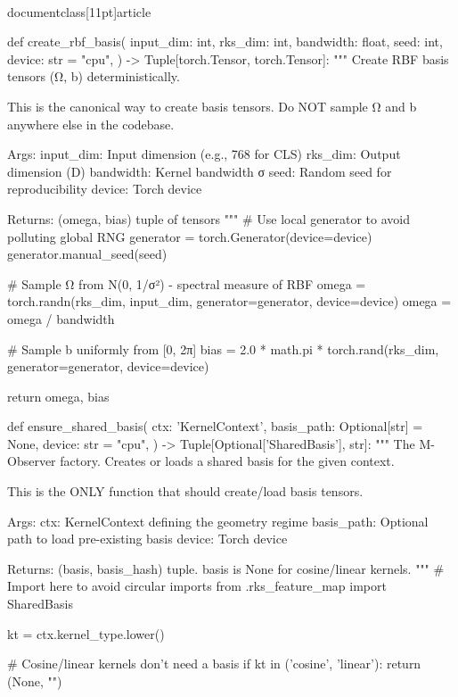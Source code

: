 \\documentclass[11pt]{article}
\begin{document}
\begin{CodeBlock}
def create_rbf_basis(
    input_dim: int,
    rks_dim: int,
    bandwidth: float,
    seed: int,
    device: str = "cpu",
) -> Tuple[torch.Tensor, torch.Tensor]:
    """
    Create RBF basis tensors (Ω, b) deterministically.
    
    This is the canonical way to create basis tensors. Do NOT sample
    Ω and b anywhere else in the codebase.
    
    Args:
        input_dim: Input dimension (e.g., 768 for CLS)
        rks_dim: Output dimension (D)
        bandwidth: Kernel bandwidth σ
        seed: Random seed for reproducibility
        device: Torch device
        
    Returns:
        (omega, bias) tuple of tensors
    """
    # Use local generator to avoid polluting global RNG
    generator = torch.Generator(device=device)
    generator.manual_seed(seed)
    
    # Sample Ω from N(0, 1/σ²) - spectral measure of RBF
    omega = torch.randn(rks_dim, input_dim, generator=generator, device=device)
    omega = omega / bandwidth
    
    # Sample b uniformly from [0, 2π]
    bias = 2.0 * math.pi * torch.rand(rks_dim, generator=generator, device=device)
    
    return omega, bias


def ensure_shared_basis(
    ctx: 'KernelContext',
    basis_path: Optional[str] = None,
    device: str = "cpu",
) -> Tuple[Optional['SharedBasis'], str]:
    """
    The M-Observer factory. Creates or loads a shared basis for the given context.
    
    This is the ONLY function that should create/load basis tensors.
    
    Args:
        ctx: KernelContext defining the geometry regime
        basis_path: Optional path to load pre-existing basis
        device: Torch device
        
    Returns:
        (basis, basis_hash) tuple. basis is None for cosine/linear kernels.
    """
    # Import here to avoid circular imports
    from .rks_feature_map import SharedBasis
    
    kt = ctx.kernel_type.lower()
    
    # Cosine/linear kernels don't need a basis
    if kt in ('cosine', 'linear'):
        return (None, "")
    

\end{CodeBlock}
\end{document}
